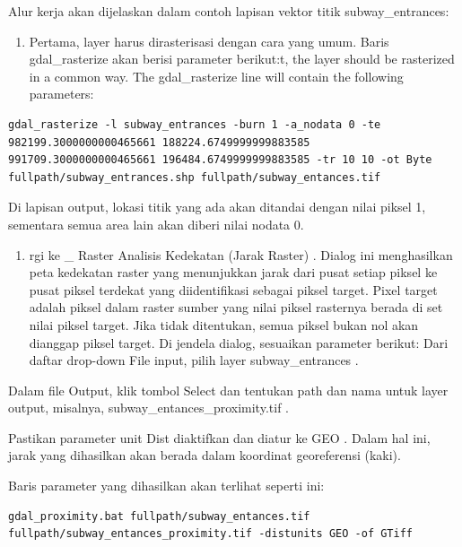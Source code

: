 \documentclass[]{book}
\providecommand{\tightlist}{%
  \setlength{\itemsep}{0pt}\setlength{\parskip}{0pt}}
\begin{document}
Alur kerja akan dijelaskan dalam contoh lapisan vektor titik subway\_entrances:

\begin{enumerate}
\def\labelenumi{\arabic{enumi}.}
\tightlist
\item
  Pertama, layer harus dirasterisasi dengan cara yang umum. Baris gdal\_rasterize akan berisi parameter berikut:t, the layer should be rasterized in a common way. The gdal\_rasterize line will contain the following parameters:
\end{enumerate}

\begin{verbatim}
gdal_rasterize -l subway_entrances -burn 1 -a_nodata 0 -te 982199.3000000000465661 188224.6749999999883585 991709.3000000000465661 196484.6749999999883585 -tr 10 10 -ot Byte fullpath/subway_entrances.shp fullpath/subway_entances.tif
\end{verbatim}

Di lapisan output, lokasi titik yang ada akan ditandai dengan nilai piksel 1, sementara semua area lain akan diberi nilai nodata 0.

\begin{enumerate}
\def\labelenumi{\arabic{enumi}.}
\setcounter{enumi}{1}
\tightlist
\item
  rgi ke \_ Raster \textbar{} Analisis \textbar{} Kedekatan (Jarak Raster) . Dialog ini menghasilkan peta kedekatan raster yang menunjukkan jarak dari pusat setiap piksel ke pusat piksel terdekat yang diidentifikasi sebagai piksel target. Pixel target adalah piksel dalam raster sumber yang nilai piksel rasternya berada di set nilai piksel target. Jika tidak ditentukan, semua piksel bukan nol akan dianggap piksel target. Di jendela dialog, sesuaikan parameter berikut:
  Dari daftar drop-down File input, pilih layer subway\_entrances .
\end{enumerate}

Dalam file Output, klik tombol Select dan tentukan path dan nama untuk layer output, misalnya, subway\_entances\_proximity.tif .

Pastikan parameter unit Dist diaktifkan dan diatur ke GEO . Dalam hal ini, jarak yang dihasilkan akan berada dalam koordinat georeferensi (kaki).

Baris parameter yang dihasilkan akan terlihat seperti ini:

\begin{verbatim}
gdal_proximity.bat fullpath/subway_entances.tif fullpath/subway_entances_proximity.tif -distunits GEO -of GTiff
\end{verbatim}
\end{document}
